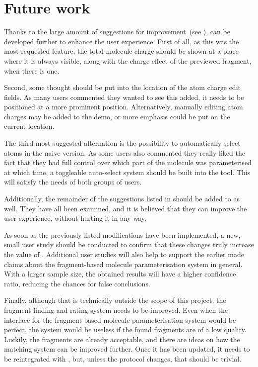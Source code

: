 \section{Future work}
Thanks to the large amount of suggestions for improvement~(see ), \oframp{} can be developed further to enhance the user experience. First of all, as this was the most requested feature, the total molecule charge should be shown at a place where it is always visible, along with the charge effect of the previewed fragment, when there is one.

Second, some thought should be put into the location of the atom charge edit fields. As many users commented they wanted to see this added, it needs to be positioned at a more prominent position. Alternatively, manually editing atom charges may be added to the demo, or more emphasis could be put on the current location.

The third most suggested alternation is the possibility to automatically select atoms in the naive version. As some users also commented they really liked the fact that they had full control over which part of the molecule was parameterised at which time, a toggleable auto-select system should be built into the tool. This will satisfy the needs of both groups of users.

Additionally, the remainder of the suggestions listed in  should be added to \oframp{} as well. They have all been examined, and it is believed that they can improve the user experience, without hurting it in any way.

As soon as the previously listed modifications have been implemented, a new, small user study should be conducted to confirm that these changes truly increase the value of \oframp. Additional user studies will also help to support the earlier made claims about the fragment-based molecule parameterisation system in general. With a larger sample size, the obtained results will have a higher confidence ratio, reducing the chances for false conclusions.

Finally, although that is technically outside the scope of this project, the fragment finding and rating system needs to be improved. Even when the interface for the fragment-based molecule parameterisation system would be perfect, the system would be useless if the found fragments are of a low quality. Luckily, the fragments are already acceptable, and there are ideas on how the matching system can be improved further. Once it has been updated, it needs to be reintegrated with \oframp, but, unless the protocol changes, that should be trivial.
